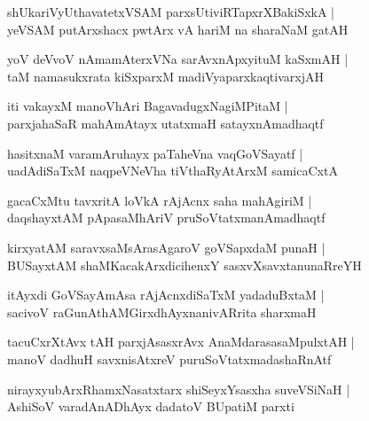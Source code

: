 \documentclass[twoside,12pt,openright]{book}
\newcounter{shloka}[chapter]
\begin{document}
\begin{shloka}%
shUkariVyUthavatetxVSAM parxsUtiviRTapxrXBakiSxkA |\\
yeVSAM putArxshacx pwtArx vA hariM na sharaNaM gatAH 
\end{shloka}

\begin{shloka}%
yoV deVvoV nAmamAterxVNa sarAvxnApxyituM kaSxmAH |\\
taM namasukxrata kiSxparxM madiVyaparxkaqtivarxjAH 
\end{shloka}

\begin{shloka}%
iti vakayxM manoVhAri BagavadugxNagiMPitaM |\\
parxjahaSaR mahAmAtayx utatxmaH satayxnAmadhaqtf
\end{shloka}

\begin{shloka}%
hasitxnaM varamAruhayx paTaheVna vaqGoVSayatf |\\
uadAdiSaTxM naqpeVNeVha tiVthaRyAtArxM samicaCxtA 
\end{shloka}

\begin{shloka}%
gacaCxMtu tavxritA loVkA rAjAcnx saha mahAgiriM |\\
daqshayxtAM pApasaMhAriV pruSoVtatxmanAmadhaqtf
\end{shloka}

\begin{shloka}%
kirxyatAM saravxsaMsArasAgaroV goVSapxdaM punaH |\\
BUSayxtAM shaMKacakArxdicihenxY sasxvXsavxtanunaRreYH
\end{shloka}

\begin{shloka}%
itAyxdi GoVSayAmAsa rAjAcnxdiSaTxM yadaduBxtaM |\\
sacivoV raGunAthAMGirxdhAyxnanivARrita sharxmaH
\end{shloka}

\begin{shloka}%
tacuCxrXtAvx tAH parxjAsasxrAvx AnaMdarasasaMpulxtAH |\\
manoV dadhuH savxnisAtxreV puruSoVtatxmadashaRnAtf 
\end{shloka}

\begin{shloka}%
nirayxyubArxRhamxNasatxtarx shiSeyxYsasxha suveVSiNaH |\\
AshiSoV varadAnADhAyx dadatoV BUpatiM parxti
\end{shloka}
\end{document}
